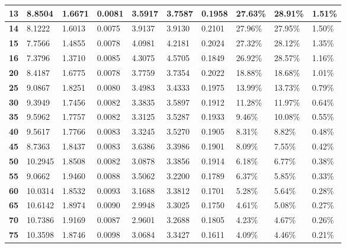 \begin{table}[ht]
\begin{tabular}{l|l|l|l|l|l|l|l|l|l|}
\multicolumn{1}{|l|}{\textbf{13}} & 8.8504 & 1.6671 & 0.0081 & 3.5917 & 3.7587 & 0.1958 & 27.63\% & 28.91\% & 1.51\% \\ \hline
\multicolumn{1}{|l|}{\textbf{14}} & 8.1222 & 1.6013 & 0.0075 & 3.9137 & 3.9130 & 0.2101 & 27.96\% & 27.95\% & 1.50\% \\ \hline
\multicolumn{1}{|l|}{\textbf{15}} & 7.7566 & 1.4855 & 0.0078 & 4.0981 & 4.2181 & 0.2024 & 27.32\% & 28.12\% & 1.35\% \\ \hline
\multicolumn{1}{|l|}{\textbf{16}} & 7.3796 & 1.3710 & 0.0085 & 4.3075 & 4.5705 & 0.1849 & 26.92\% & 28.57\% & 1.16\% \\ \hline
\multicolumn{1}{|l|}{\textbf{20}} & 8.4187 & 1.6775 & 0.0078 & 3.7759 & 3.7354 & 0.2022 & 18.88\% & 18.68\% & 1.01\% \\ \hline
\multicolumn{1}{|l|}{\textbf{25}} & 9.0867 & 1.8251 & 0.0080 & 3.4983 & 3.4333 & 0.1975 & 13.99\% & 13.73\% & 0.79\% \\ \hline
\multicolumn{1}{|l|}{\textbf{30}} & 9.3949 & 1.7456 & 0.0082 & 3.3835 & 3.5897 & 0.1912 & 11.28\% & 11.97\% & 0.64\% \\ \hline
\multicolumn{1}{|l|}{\textbf{35}} & 9.5962 & 1.7757 & 0.0082 & 3.3125 & 3.5287 & 0.1933 & 9.46\% & 10.08\% & 0.55\% \\ \hline
\multicolumn{1}{|l|}{\textbf{40}} & 9.5617 & 1.7766 & 0.0083 & 3.3245 & 3.5270 & 0.1905 & 8.31\% & 8.82\% & 0.48\% \\ \hline
\multicolumn{1}{|l|}{\textbf{45}} & 8.7363 & 1.8437 & 0.0083 & 3.6386 & 3.3986 & 0.1901 & 8.09\% & 7.55\% & 0.42\% \\ \hline
\multicolumn{1}{|l|}{\textbf{50}} & 10.2945 & 1.8508 & 0.0082 & 3.0878 & 3.3856 & 0.1914 & 6.18\% & 6.77\% & 0.38\% \\ \hline
\multicolumn{1}{|l|}{\textbf{55}} & 9.0662 & 1.9460 & 0.0088 & 3.5062 & 3.2200 & 0.1789 & 6.37\% & 5.85\% & 0.33\% \\ \hline
\multicolumn{1}{|l|}{\textbf{60}} & 10.0314 & 1.8532 & 0.0093 & 3.1688 & 3.3812 & 0.1701 & 5.28\% & 5.64\% & 0.28\% \\ \hline
\multicolumn{1}{|l|}{\textbf{65}} & 10.6142 & 1.8974 & 0.0090 & 2.9948 & 3.3025 & 0.1750 & 4.61\% & 5.08\% & 0.27\% \\ \hline
\multicolumn{1}{|l|}{\textbf{70}} & 10.7386 & 1.9169 & 0.0087 & 2.9601 & 3.2688 & 0.1805 & 4.23\% & 4.67\% & 0.26\% \\ \hline
\multicolumn{1}{|l|}{\textbf{75}} & 10.3598 & 1.8746 & 0.0098 & 3.0684 & 3.3427 & 0.1611 & 4.09\% & 4.46\% & 0.21\% \\ \hline

\end{tabular}
\end{table}

